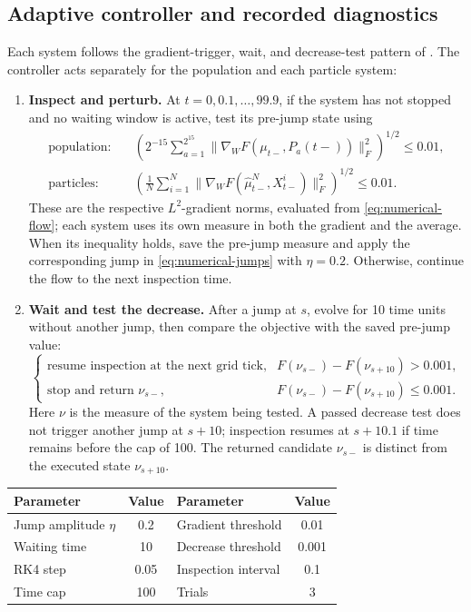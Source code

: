 \subsection{Adaptive controller and recorded diagnostics}
\label{subsec:numerical-diagnostics}

Each system follows the gradient-trigger, wait, and decrease-test pattern of
\citet[Algorithm~1]{yamamoto2025hessianguided}. The controller acts separately
for the population and each particle system:
\begin{enumerate}
\item \textbf{Inspect and perturb.}
At \(t=0,0.1,\ldots,99.9\), if the system has not stopped and no waiting
window is active, test its pre-jump state using
\[
\begin{aligned}
\text{population:}\quad &
 \left(2^{-15}\sum_{a=1}^{2^{15}}
 \|\nabla_WF(\mu_{t-},P_a(t-))\|_F^2\right)^{1/2}\le0.01,\\
\text{particles:}\quad &
 \left(\frac1N\sum_{i=1}^N
 \|\nabla_WF(\widehat\mu_{t-}^N,X_{t-}^i)\|_F^2\right)^{1/2}\le0.01.
\end{aligned}
\]
These are the respective \(L^2\)-gradient norms, evaluated from
\cref{eq:numerical-flow}; each system uses its own measure in both the gradient
and the average. When its inequality holds, save the pre-jump measure and
apply the corresponding jump in \cref{eq:numerical-jumps} with \(\eta=0.2\).
Otherwise, continue the flow to the next inspection time.
\item \textbf{Wait and test the decrease.}
After a jump at \(s\), evolve for 10 time units without another jump, then
compare the objective with the saved pre-jump value:
\[
\begin{cases}
 \text{resume inspection at the next grid tick},
   &F(\nu_{s-})-F(\nu_{s+10})>0.001,\\
 \text{stop and return }\nu_{s-},
   &F(\nu_{s-})-F(\nu_{s+10})\le0.001.
\end{cases}
\]
Here \(\nu\) is the measure of the system being tested. A passed decrease test
does not trigger another jump at \(s+10\); inspection resumes at \(s+10.1\)
if time remains before the cap of 100. The returned candidate \(\nu_{s-}\)
is distinct from the executed state \(\nu_{s+10}\).
\end{enumerate}

\begin{center}
\begin{tabular}{@{}lclc@{}}
\toprule
Parameter & Value & Parameter & Value\\
\midrule
Jump amplitude \(\eta\) & 0.2 & Gradient threshold & 0.01\\
Waiting time & 10 & Decrease threshold & 0.001\\
RK4 step & 0.05 & Inspection interval & 0.1\\
Time cap & 100 & Trials & 3\\
\bottomrule
\end{tabular}
\end{center}

